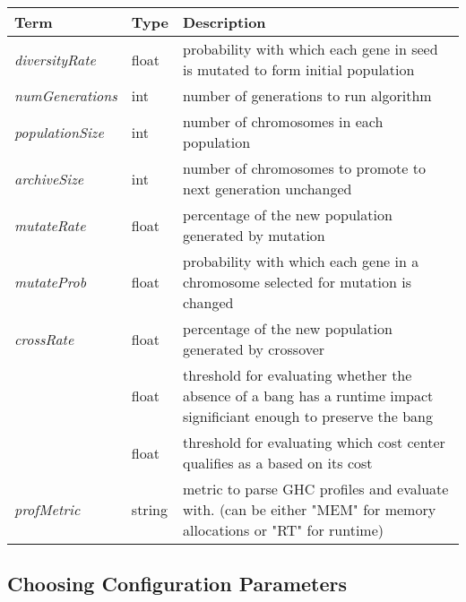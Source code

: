 {\renewcommand{\arraystretch}{1.5}
\begin{table}
\begin{tabular}{p{3cm}p{2cm}p{8cm}}
\hline
Term    &   Type    &   Description \\
\hline
\textit{diversityRate}  &   float   &   probability with which each gene 
                                        in seed is mutated to form initial 
                                        population\\
\textit{numGenerations} &   int     &   number of generations to run algorithm\\
\textit{populationSize} &   int     &   number of chromosomes in each population\\
\textit{archiveSize}    &   int     &   number of chromosomes to promote to
                                        next generation unchanged\\
\textit{mutateRate}     &   float   &   percentage of the new population 
                                        generated by mutation\\
\textit{mutateProb}     &   float   &   probability with which each gene in
                                        a chromosome selected for mutation is
                                        changed\\ 
\textit{crossRate}      &   float   &   percentage of the new population 
                                        generated by crossover\\
\textit{\absim{}}       &   float   &   threshold for evaluating whether the absence
                                        of a bang has a runtime impact significiant
                                        enough to preserve the bang \\
\textit{\hotspotcost{}} &   float   &   threshold for evaluating which cost center
                                        qualifies as a \hotspot{} based on its cost\\
\textit{profMetric}     &   string  &   metric to parse GHC profiles and 
                                        evaluate \hotspots{} with. (can be either
                                        "MEM" for memory allocations or "RT" for
                                        runtime)\\
\hline
\end{tabular}
\label{tab:A2params}
\end{table}}

\subsection{Choosing Configuration Parameters}

